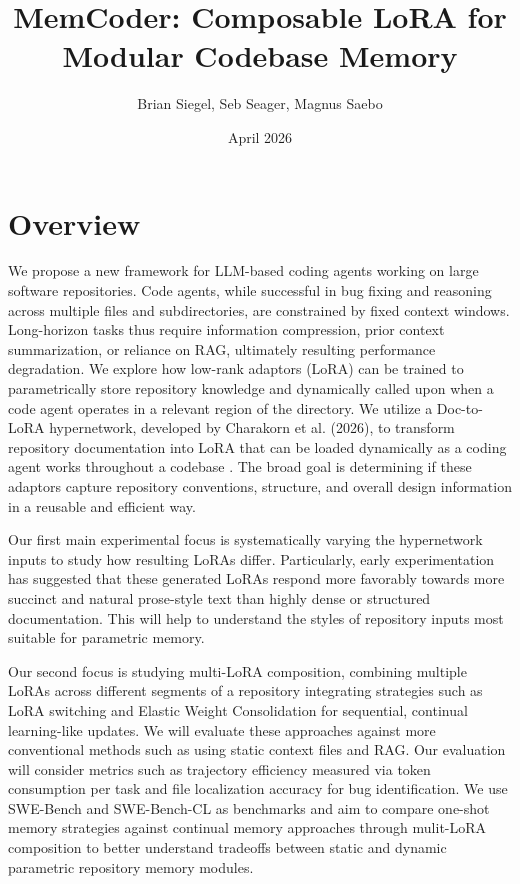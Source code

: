 \documentclass{article}
\title{MemCoder: Composable LoRA for Modular Codebase Memory}
\author{Brian Siegel, Seb Seager, Magnus Saebo}
\date{April 2026}
\begin{document}
\maketitle

\section{Overview}
We propose a new framework for LLM-based coding agents working on large software repositories. Code agents, while successful in bug fixing and reasoning across multiple files and subdirectories, are constrained by fixed context windows. Long-horizon tasks thus require information compression, prior context summarization, or reliance on RAG, ultimately resulting performance degradation. We explore how low-rank adaptors (LoRA) can be trained to parametrically store repository knowledge and dynamically called upon when a code agent operates in a relevant region of the directory. We utilize a Doc-to-LoRA hypernetwork, developed by Charakorn et al. (2026), to transform repository documentation into LoRA that can be loaded dynamically as a coding agent works throughout a codebase \cite{doctolora}. The broad goal is determining if these adaptors capture repository conventions, structure, and overall design information in a reusable and efficient way.

Our first main experimental focus is systematically varying the hypernetwork inputs to study how resulting LoRAs differ. Particularly, early experimentation has suggested that these generated LoRAs respond more favorably towards more succinct and natural prose-style text than highly dense or structured documentation. This will help to understand the styles of repository inputs most suitable for parametric memory.

Our second focus is studying multi-LoRA composition, combining multiple LoRAs across different segments of a repository integrating strategies such as LoRA switching and Elastic Weight Consolidation for sequential, continual learning-like updates. We will evaluate these approaches against more conventional methods such as using static context files and RAG. Our evaluation will consider metrics such as trajectory efficiency measured via token consumption per task and file localization accuracy for bug identification. We use SWE-Bench and SWE-Bench-CL as benchmarks and aim to compare one-shot memory strategies against continual memory approaches through mulit-LoRA composition to better understand tradeoffs between static and dynamic parametric repository memory modules. 
\end{document}
